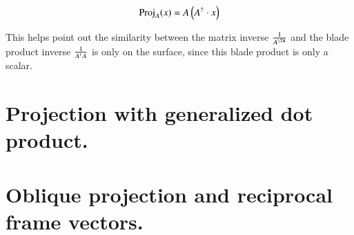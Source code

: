 \documentclass{article}      %
\DeclareMathOperator{\T}{T}
\begin{document}
\[
\operatorname{Proj}_A(x) = A \left(A^\dagger \cdot x\right)
\]

This helps point out the similarity between the matrix inverse $\inv{A^\TA}$ and the blade product inverse $\frac{1}{{A^\dagger}A}$ is only on the surface,
since this blade product is only a scalar.






\section{ Projection with generalized dot product. }

\section{ Oblique projection and reciprocal frame vectors. }




















%
%
%




%
\end{document}
